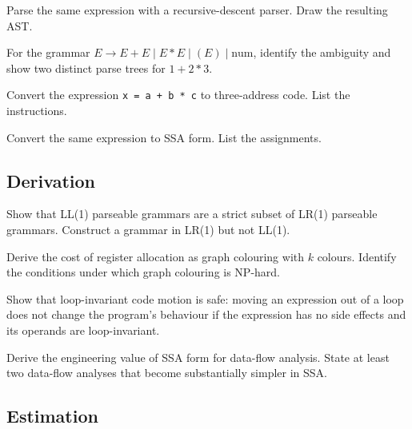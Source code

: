 \begin{exercise}
Parse the same expression with a recursive-descent parser. Draw the resulting AST.
\end{exercise}

\begin{exercise}
For the grammar $E \to E + E \mid E * E \mid (E) \mid \text{num}$, identify the ambiguity and show two distinct parse trees for $1 + 2 * 3$.
\end{exercise}

\begin{exercise}
Convert the expression \texttt{x = a + b * c} to three-address code. List the instructions.
\end{exercise}

\begin{exercise}
Convert the same expression to SSA form. List the assignments.
\end{exercise}

\subsection*{Derivation}

\begin{exercise}
Show that LL(1) parseable grammars are a strict subset of LR(1) parseable grammars. Construct a grammar in LR(1) but not LL(1).
\end{exercise}

\begin{exercise}
Derive the cost of register allocation as graph colouring with $k$ colours. Identify the conditions under which graph colouring is NP-hard.
\end{exercise}

\begin{exercise}
Show that loop-invariant code motion is safe: moving an expression out of a loop does not change the program's behaviour if the expression has no side effects and its operands are loop-invariant.
\end{exercise}

\begin{exercise}
Derive the engineering value of SSA form for data-flow analysis. State at least two data-flow analyses that become substantially simpler in SSA.
\end{exercise}

\subsection*{Estimation}

